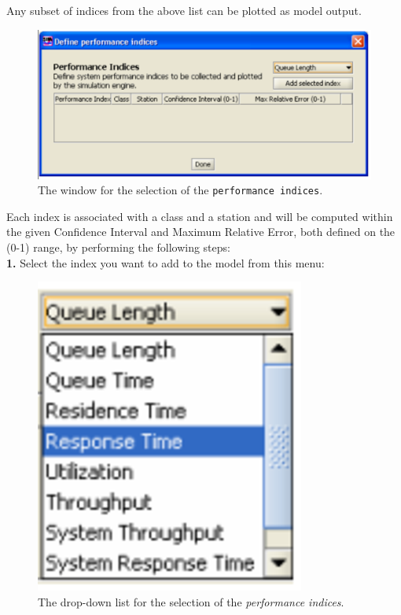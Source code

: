 Any subset of indices from the above list can be plotted as
model output.
\begin{figure}[htb]
    \begin{center}
        \includegraphics[scale=.5]{img/jsimg/5.1.eps}
    \end{center}
    \caption{The window for the selection of the \texttt{performance indices}.}
    \label{fig:selperfind}
\end{figure}
Each index is associated with a class and a station and will be
computed within the given Confidence Interval and Maximum Relative
Error, both defined on the (0-1) range, by performing the
following steps:\\
\textbf{1.} Select the index you want to add to the model from
this menu:
\begin{figure}[htb]
    \begin{center}
        \includegraphics[scale=.5]{img/jsimg/5.2.eps}
    \end{center}
    \caption{The drop-down list for the selection of the \emph{performance indices}.}
    \label{fig:dropdownlistperfind}
\end{figure}\\
